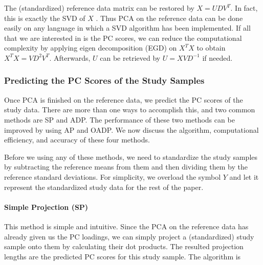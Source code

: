 \documentclass{article}
\begin{document}
The (standardized) reference data matrix can be restored by $X = U D V^T$.
In fact, this is exactly the SVD of $X$ \citep{jolliffe2002principal}.
Thus PCA on the reference data can be done easily on any language
in which a SVD algorithm has been implemented.
If all that we are interested in is the PC scores,
we can reduce the computational complexity by applying eigen decomposition (EGD) on $X^TX$
to obtain $X^T X = V D^2 V^T$.
Afterwards, $U$ can be retrieved by $U = X V D^{-1}$ if needed.

\subsubsection{Predicting the PC Scores of the Study Samples}

Once PCA is finished on the reference data,
we predict the PC scores of the study data.
There are more than one ways to accomplish this,
and two common methods are SP and ADP.
The performance of these two methods can be improved by using AP and OADP.
We now discuss the algorithm, computational efficiency, and accuracy of these four methods.

Before we using any of these methods,
we need to standardize the study samples
by subtracting the reference means from them
and then dividing them by the reference standard deviations.
For simplicity,
we overload the symbol $Y$
and let it represent the standardized study data for the rest of the paper.

\paragraph{Simple Projection (SP)}
This method is simple and intuitive.
Since the PCA on the reference data has already given us the PC loadings,
we can simply project a (standardized) study sample onto them by calculating their dot products.
The resulted projection lengths are the predicted PC scores for this study sample.
The algorithm is
\end{document}
